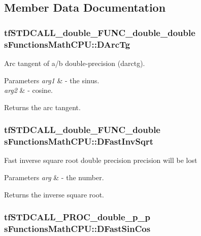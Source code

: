 \subsection{Member Data Documentation}
\hypertarget{structs_functions_math_c_p_u_a558bf5c516c2ad1325f9de1a364b9265}{
\subsubsection[{D\-Arc\-Tg}]{\setlength{\rightskip}{0pt plus 5cm}tf\-S\-T\-D\-C\-A\-L\-L\-\_\-double\-\_\-\-F\-U\-N\-C\-\_\-double\-\_\-double s\-Functions\-Math\-C\-P\-U\-::\-D\-Arc\-Tg}}\label{structs_functions_math_c_p_u_a558bf5c516c2ad1325f9de1a364b9265}
Arc tangent of a/b double-\/precision (darctg). 
\begin{DoxyParams}{Parameters}
{\em arg1} & -\/ the sinus. \\
\hline
{\em arg2} & -\/ cosine. \\
\hline
\end{DoxyParams}
\begin{DoxyReturn}{Returns}
the arc tangent. 
\end{DoxyReturn}
\hypertarget{structs_functions_math_c_p_u_ace8f80905e985a37f8212c0fd805c9e4}{
\subsubsection[{D\-Fast\-Inv\-Sqrt}]{\setlength{\rightskip}{0pt plus 5cm}tf\-S\-T\-D\-C\-A\-L\-L\-\_\-double\-\_\-\-F\-U\-N\-C\-\_\-double s\-Functions\-Math\-C\-P\-U\-::\-D\-Fast\-Inv\-Sqrt}}\label{structs_functions_math_c_p_u_ace8f80905e985a37f8212c0fd805c9e4}
Fast inverse square root double precision precision will be lost 
\begin{DoxyParams}{Parameters}
{\em arg} & -\/ the number. \\
\hline
\end{DoxyParams}
\begin{DoxyReturn}{Returns}
the inverse square root. 
\end{DoxyReturn}
\hypertarget{structs_functions_math_c_p_u_a1338de939a5f834cbf437a3df3183464}{
\subsubsection[{D\-Fast\-Sin\-Cos}]{\setlength{\rightskip}{0pt plus 5cm}tf\-S\-T\-D\-C\-A\-L\-L\-\_\-\-P\-R\-O\-C\-\_\-double\-\_\-p\-\_\-p s\-Functions\-Math\-C\-P\-U\-::\-D\-Fast\-Sin\-Cos}}\label{structs_functions_math_c_p_u_a1338de939a5f834cbf437a3df3183464}
